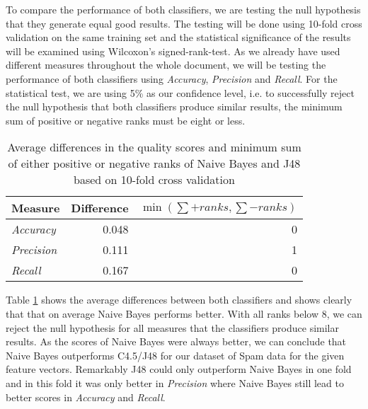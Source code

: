 To compare the performance of both classifiers, we are testing the null hypothesis that they generate equal good results.
The testing will be done using 10-fold cross validation on the same training set and the statistical significance of the results will be examined using Wilcoxon's signed-rank-test.
As we already have used different measures throughout the whole document, we will be testing the performance of both classifiers using \emph{Accuracy}, \emph{Precision} and \emph{Recall}.
For the statistical test, we are using 5\% as our confidence level, i.e. to successfully reject the null hypothesis that both classifiers produce similar results, the minimum sum of positive or negative ranks must be eight or less.

\begin{table}[h!]
    \centering
    \begin{tabular}{ | l | r | r | }
        \hline
        \textbf{Measure} & \textbf{Difference} & $\min(\sum +ranks, \sum -ranks)$ \\
        \hline
        \emph{Accuracy} & 0.048 & 0 \\
        \hline
        \emph{Precision} & 0.111 & 1 \\
        \hline
        \emph{Recall} & 0.167 & 0 \\
        \hline
    \end{tabular}
    \caption{Average differences in the quality scores and minimum sum of either positive or negative ranks of Naive Bayes and J48 based on 10-fold cross validation}
    \label{table:difference}
\end{table}

Table \ref{table:difference} shows the average differences between both classifiers and shows clearly that that on average Naive Bayes performs better.
With all ranks below $8$, we can reject the null hypothesis for all measures that the classifiers produce similar results.
As the scores of Naive Bayes were always better, we can conclude that Naive Bayes outperforms C4.5/J48 for our dataset of Spam data for the given feature vectors.
Remarkably J48 could only outperform Naive Bayes in one fold and in this fold it was only better in \emph{Precision} where Naive Bayes still lead to better scores in \emph{Accuracy} and \emph{Recall}.

